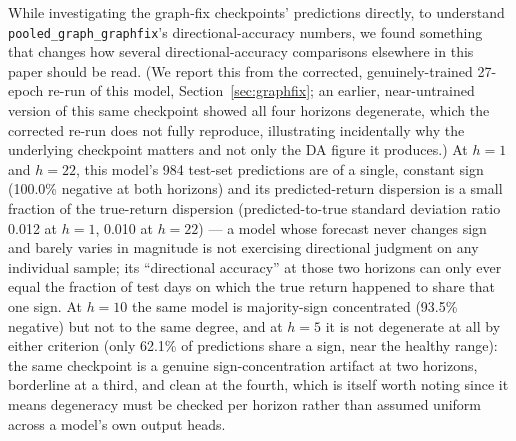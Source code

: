 \documentclass[journal]{IEEEtran}
\begin{document}
While investigating the graph-fix checkpoints' predictions directly, to understand \texttt{pooled\_graph\_graphfix}'s directional-accuracy numbers, we found something that changes how several directional-accuracy comparisons elsewhere in this paper should be read. (We report this from the corrected, genuinely-trained 27-epoch re-run of this model, Section~\ref{sec:graphfix}; an earlier, near-untrained version of this same checkpoint showed all four horizons degenerate, which the corrected re-run does not fully reproduce, illustrating incidentally why the underlying checkpoint matters and not only the DA figure it produces.) At $h=1$ and $h=22$, this model's 984 test-set predictions are of a single, constant sign (100.0\% negative at both horizons) and its predicted-return dispersion is a small fraction of the true-return dispersion (predicted-to-true standard deviation ratio 0.012 at $h=1$, 0.010 at $h=22$) --- a model whose forecast never changes sign and barely varies in magnitude is not exercising directional judgment on any individual sample; its ``directional accuracy'' at those two horizons can only ever equal the fraction of test days on which the true return happened to share that one sign. At $h=10$ the same model is majority-sign concentrated (93.5\% negative) but not to the same degree, and at $h=5$ it is not degenerate at all by either criterion (only 62.1\% of predictions share a sign, near the healthy range): the same checkpoint is a genuine sign-concentration artifact at two horizons, borderline at a third, and clean at the fourth, which is itself worth noting since it means degeneracy must be checked per horizon rather than assumed uniform across a model's own output heads.
\end{document}
